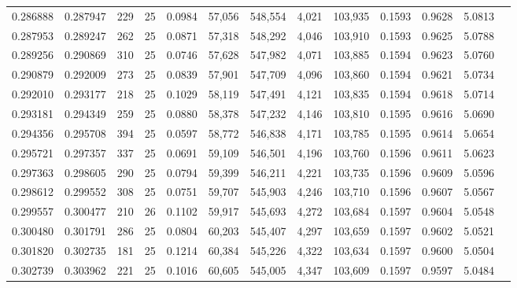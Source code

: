 \begin{tabular}{rrrrrrrrrrrrr}
0.286888 & 0.287947 &   229 &  25 &                                     0.0984 &  57,056 & 548,554 &   4,021 & 103,935 & 0.1593 & 0.9628 & 5.0813 \\
0.287953 & 0.289247 &   262 &  25 &                                     0.0871 &  57,318 & 548,292 &   4,046 & 103,910 & 0.1593 & 0.9625 & 5.0788 \\
0.289256 & 0.290869 &   310 &  25 &                                     0.0746 &  57,628 & 547,982 &   4,071 & 103,885 & 0.1594 & 0.9623 & 5.0760 \\
0.290879 & 0.292009 &   273 &  25 &                                     0.0839 &  57,901 & 547,709 &   4,096 & 103,860 & 0.1594 & 0.9621 & 5.0734 \\
0.292010 & 0.293177 &   218 &  25 &                                     0.1029 &  58,119 & 547,491 &   4,121 & 103,835 & 0.1594 & 0.9618 & 5.0714 \\
0.293181 & 0.294349 &   259 &  25 &                                     0.0880 &  58,378 & 547,232 &   4,146 & 103,810 & 0.1595 & 0.9616 & 5.0690 \\
0.294356 & 0.295708 &   394 &  25 &                                     0.0597 &  58,772 & 546,838 &   4,171 & 103,785 & 0.1595 & 0.9614 & 5.0654 \\
0.295721 & 0.297357 &   337 &  25 &                                     0.0691 &  59,109 & 546,501 &   4,196 & 103,760 & 0.1596 & 0.9611 & 5.0623 \\
0.297363 & 0.298605 &   290 &  25 &                                     0.0794 &  59,399 & 546,211 &   4,221 & 103,735 & 0.1596 & 0.9609 & 5.0596 \\
0.298612 & 0.299552 &   308 &  25 &                                     0.0751 &  59,707 & 545,903 &   4,246 & 103,710 & 0.1596 & 0.9607 & 5.0567 \\
0.299557 & 0.300477 &   210 &  26 &                                     0.1102 &  59,917 & 545,693 &   4,272 & 103,684 & 0.1597 & 0.9604 & 5.0548 \\
0.300480 & 0.301791 &   286 &  25 &                                     0.0804 &  60,203 & 545,407 &   4,297 & 103,659 & 0.1597 & 0.9602 & 5.0521 \\
0.301820 & 0.302735 &   181 &  25 &                                     0.1214 &  60,384 & 545,226 &   4,322 & 103,634 & 0.1597 & 0.9600 & 5.0504 \\
0.302739 & 0.303962 &   221 &  25 &                                     0.1016 &  60,605 & 545,005 &   4,347 & 103,609 & 0.1597 & 0.9597 & 5.0484 \\

\end{tabular}
